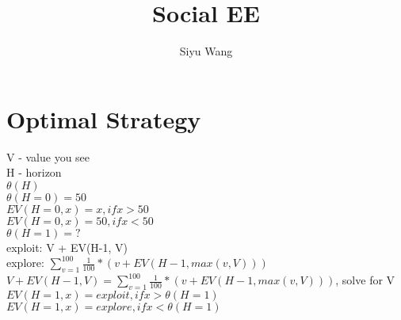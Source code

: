 \documentclass{article}
\title{Social EE}
\author{Siyu Wang}
\date{ }
\begin{document}
\maketitle
\tableofcontents
\section{Optimal Strategy}
V -  value you see\\
H - horizon\\
$\theta(H)$\\

$\theta(H = 0) =  50$\\
$EV(H = 0, x) = x, if x > 50$\\
$EV(H = 0, x) = 50, if x < 50$\\


$\theta(H = 1) = ? $\\

exploit: V + EV(H-1, V)\\
explore: $\sum_{v = 1}^{100}{\frac{1}{100} * (v + EV(H-1, max(v, V)))}$\\




 $V + EV(H-1, V) = \sum_{v = 1}^{100}{\frac{1}{100} * (v + EV(H-1, max(v, V)))}$, solve for V \\
 
$ EV(H = 1, x) = exploit, if x > \theta(H = 1)$\\
$ EV(H = 1, x) = explore, if x < \theta(H = 1)$\\

 
\end{document}
